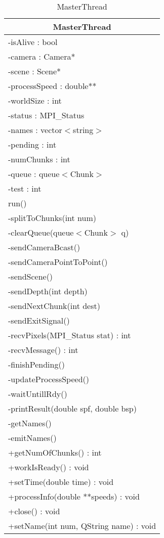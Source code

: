 \footnotesize
\begin{longtable}{|p{14cm}|}
    \caption{MasterThread} \label{tab:MasterThread} \\ \hline
    \multicolumn{1}{|c|}{MasterThread} \\ \hline
    -isAlive : bool \\
    -camera : Camera* \\
    -scene : Scene* \\
    -processSpeed : double** \\
    -worldSize : int \\
    -status : MPI\_Status \\
    -names : vector$<$string$>$ \\
    -pending : int \\
    -numChunks : int \\
    -queue : queue$<$Chunk$>$ \\
    -test : int \\
    \hline
	run() \\
	-splitToChunks(int num) \\
	-clearQueue(queue$<$Chunk$>$ q) \\
    -sendCameraBcast() \\
    -sendCameraPointToPoint() \\
    -sendScene() \\
    -sendDepth(int depth) \\
    -sendNextChunk(int dest) \\
    -sendExitSignal() \\
    -recvPixels(MPI\_Status stat) : int \\
    -recvMessage() : int \\
    -finishPending() \\
    -updateProcessSpeed() \\
    -waitUntillRdy() \\
    -printResult(double spf, double bsp) \\
    -getNames() \\
    -emitNames() \\
    +getNumOfChunks() : int \\
    +workIsReady() : void \\
    +setTime(double time) : void \\
    +processInfo(double **speeds) : void \\
    +close() : void \\
    +setName(int num, QString name) : void \\
	\hline
\end{longtable}
\normalsize

